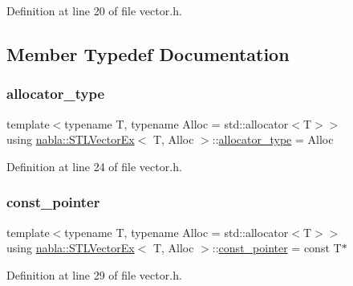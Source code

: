 Definition at line 20 of file vector.\+h.



\subsection{Member Typedef Documentation}
\mbox{\label{classnabla_1_1_s_t_l_vector_ex_a1a55b1145a1d99efca09cce9b2eac20f}} 
\subsubsection{\texorpdfstring{allocator\_type}{allocator\_type}}
{\footnotesize\ttfamily template$<$typename T, typename Alloc = std\+::allocator$<$\+T$>$$>$ \\
using \mbox{\hyperlink{classnabla_1_1_s_t_l_vector_ex}{nabla\+::\+S\+T\+L\+Vector\+Ex}}$<$ T, Alloc $>$\+::\mbox{\hyperlink{classnabla_1_1_s_t_l_vector_ex_a1a55b1145a1d99efca09cce9b2eac20f}{allocator\+\_\+type}} =  Alloc}



Definition at line 24 of file vector.\+h.

\mbox{\label{classnabla_1_1_s_t_l_vector_ex_a66d8e0fc1681c6b0809319057c890f1e}} 
\subsubsection{\texorpdfstring{const\_pointer}{const\_pointer}}
{\footnotesize\ttfamily template$<$typename T, typename Alloc = std\+::allocator$<$\+T$>$$>$ \\
using \mbox{\hyperlink{classnabla_1_1_s_t_l_vector_ex}{nabla\+::\+S\+T\+L\+Vector\+Ex}}$<$ T, Alloc $>$\+::\mbox{\hyperlink{classnabla_1_1_s_t_l_vector_ex_a66d8e0fc1681c6b0809319057c890f1e}{const\+\_\+pointer}} =  const T$\ast$}



Definition at line 29 of file vector.\+h.

